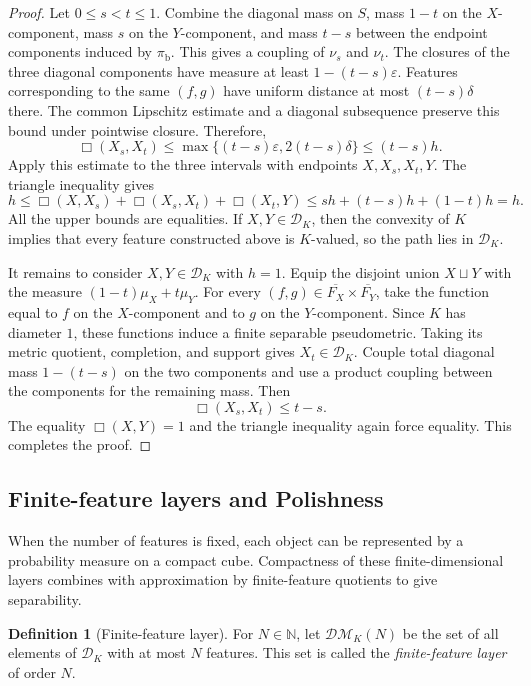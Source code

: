 \documentclass[11pt]{amsart}
\theoremstyle{plain}
\theoremstyle{definition}
\newtheorem{definition}[theorem]{Definition}
\theoremstyle{remark}
\newcommand{\DK}{\mathcal D_K}
\newcommand{\DM}{\mathcal{DM}}
\begin{document}
\begin{proof}
Let $0\leq s<t\leq1$. Combine the diagonal mass on $S$, mass $1-t$ on the $X$-component, mass $s$ on the $Y$-component, and mass $t-s$ between the endpoint components induced by $\pi_{\mathrm b}$. This gives a coupling of $\nu_s$ and $\nu_t$. The closures of the three diagonal components have measure at least $1-(t-s)\varepsilon$. Features corresponding to the same $(f,g)$ have uniform distance at most $(t-s)\delta$ there. The common Lipschitz estimate and a diagonal subsequence preserve this bound under pointwise closure. Therefore,
\[
\Box(X_s,X_t)
\leq\max\{(t-s)\varepsilon,2(t-s)\delta\}
\leq(t-s)h.
\]
Apply this estimate to the three intervals with endpoints $X,X_s,X_t,Y$. The triangle inequality gives
\[
h\leq\Box(X,X_s)+\Box(X_s,X_t)+\Box(X_t,Y)
\leq sh+(t-s)h+(1-t)h=h.
\]
All the upper bounds are equalities. If $X,Y\in\DK$, then the convexity of $K$ implies that every feature constructed above is $K$-valued, so the path lies in $\DK$.

It remains to consider $X,Y\in\DK$ with $h=1$. Equip the disjoint union $X\sqcup Y$ with the measure $(1-t)\mu_X+t\mu_Y$. For every $(f,g)\in\overline{F_X}\times\overline{F_Y}$, take the function equal to $f$ on the $X$-component and to $g$ on the $Y$-component. Since $K$ has diameter $1$, these functions induce a finite separable pseudometric. Taking its metric quotient, completion, and support gives $X_t\in\DK$. Couple total diagonal mass $1-(t-s)$ on the two components and use a product coupling between the components for the remaining mass. Then
\[
\Box(X_s,X_t)\leq t-s.
\]
The equality $\Box(X,Y)=1$ and the triangle inequality again force equality. This completes the proof.
\end{proof}

\subsection{Finite-feature layers and Polishness}
\label{subsec:screened-polish}

When the number of features is fixed, each object can be represented by a probability measure on a compact cube. Compactness of these finite-dimensional layers combines with approximation by finite-feature quotients to give separability.

\begin{definition}[Finite-feature layer]
\label{def:bounded-measurements}
For $N\in\mathbb N$, let $\DM_K(N)$ be the set of all elements of $\DK$ with at most $N$ features. This set is called the \emph{finite-feature layer} of order $N$.
\end{definition}
\end{document}
